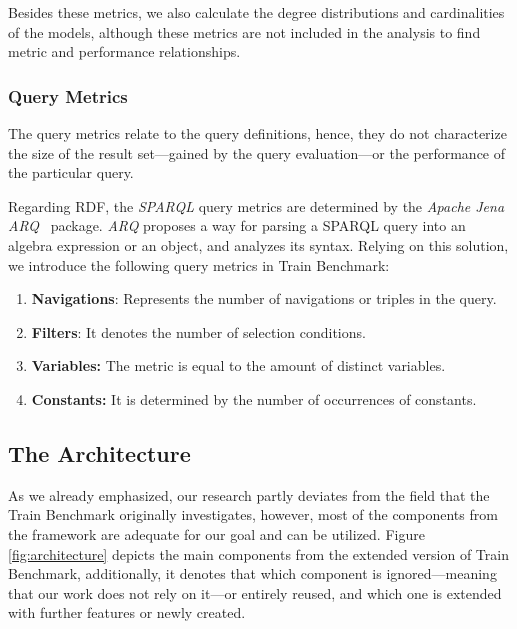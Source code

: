 Besides these metrics, we also calculate the degree distributions and cardinalities of the models, although these metrics are not included in the analysis to find metric and performance relationships.

\subsubsection{Query Metrics}

The query metrics relate to the query definitions, hence, they do not characterize the size of the result set---gained by the query evaluation---or the performance of the particular query.

Regarding RDF, the \textit{SPARQL} query metrics are determined by the \textit{Apache Jena ARQ}~\cite{jena} package. \textit{ARQ} proposes a way for parsing a SPARQL query into an algebra expression or an object, and analyzes its syntax. Relying on this solution, we introduce the following query metrics in Train Benchmark:
\begin{enumerate}
	\item{\textbf{Navigations}}: Represents the number of navigations or triples in the query.
	\item{\textbf{Filters}}: It denotes the number of selection conditions.
	\item{\textbf{Variables:}} The metric is equal to the amount of distinct variables.
	\item{\textbf{Constants:}} It is determined by the number of occurrences of constants.
\end{enumerate}
\subsection{The Architecture}

As we already emphasized, our research partly deviates from the field that the Train Benchmark originally investigates, however, most of the components from the framework are adequate for our goal and can be utilized. Figure \ref{fig:architecture} depicts the main components from the extended version of Train Benchmark, additionally, it denotes that which component is ignored---meaning that our work does not rely on it---or entirely reused, and which one is extended with further features or newly created.

